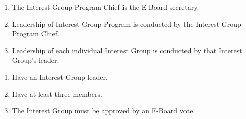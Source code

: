 
\begin{enumerate}
	\item The Interest Group Program Chief is the E-Board secretary.
	\item Leadership of Interest Group Program is conducted by the Interest Group Program
	      Chief.
	\item Leadership of each individual Interest Group is conducted by that Interest
	      Group's leader.
\end{enumerate}


\begin{enumerate}
	\item Have an Interest Group leader.
	\item Have at least three members.
	\item The Interest Group must be approved by an E-Board vote.
\end{enumerate}